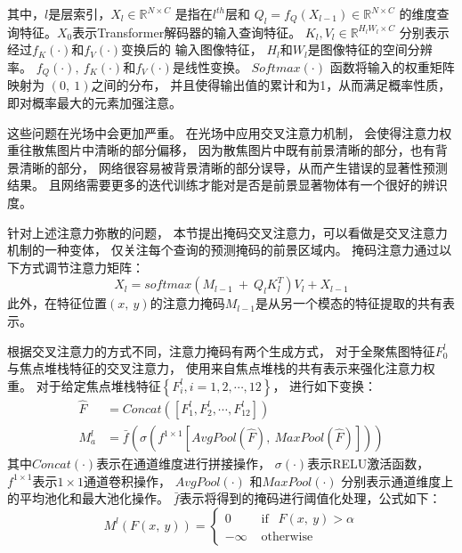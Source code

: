 其中，$l$是层索引，$X_{l} \in \mathbb{R}^{N\times C}$
是指在$l^{th}$层和
$ Q_{l} = f_{Q} \left ( X_{l-1} \right ) \in \mathbb{R}^{N \times C} $
的维度查询特征。$X_{0}$表示Transformer解码器的输入查询特征。
$K_{l},V_{l} \in \mathbb{R}^{H_{l}W_{l} \times C}$
分别表示经过$f_{K}(\cdot) $和$ f_{V}( \cdot )$变换后的
输入图像特征，
$H_{l}$和$W_{l}$是图像特征的空间分辨率。
$f_{Q} (\cdot),~f_{K}(\cdot) $和$ f_{V}(\cdot) $是线性变换。
$ Softmax(\cdot) $ 函数将输入的权重矩阵映射为 $(0,~1)$之间的分布，
并且使得输出值的累计和为1，从而满足概率性质，即对概率最大的元素加强注意。
%
%
%
%
%
\par
%
%
%
%
这些问题在光场中会更加严重。
在光场中应用交叉注意力机制，
会使得注意力权重往散焦图片中清晰的部分偏移，
因为散焦图片中既有前景清晰的部分，也有背景清晰的部分，
网络很容易被背景清晰的部分误导，从而产生错误的显著性预测结果。
且网络需要更多的迭代训练才能对是否是前景显著物体有一个很好的辨识度。
%
%
%
%
%
\par
%
%
%
%
针对上述注意力弥散的问题，
本节提出掩码交叉注意力，可以看做是交叉注意力机制的一种变体，
仅关注每个查询的预测掩码的前景区域内。
% 
% 
% 
% 
掩码注意力通过以下方式调节注意力矩阵：
\begin{equation}
	X_{l}=softmax(M_{l-1} ~+~Q_{l}K_{l}^{T})V_{l} + X_{l-1}
\end{equation}
% 
% 
此外，在特征位置$(x,~y)$的注意力掩码$M_{l-1}$是从另一个模态的特征提取的共有表示。
%
%
%
%
%
%
\par 
%
%
%
%
根据交叉注意力的方式不同，注意力掩码有两个生成方式，
对于全聚焦图特征$F_{0}^{l}$与焦点堆栈特征的交叉注意力，
使用来自焦点堆栈的共有表示来强化注意力权重。
对于给定焦点堆栈特征$\left \{ F_{i}^{l}, i=1,2,\cdots, 12 \right \}$，
进行如下变换：
%
%
%
%
\begin{equation}
\begin{aligned}
	\hat{F} &= Concat(\left [  F_{1}^{l}, F_{2}^{l}, \cdots, F_{12}^{l} \right ] ) \\
	M_{a}^{l} &= \bar{f}
	\left (  \sigma \left ( f^{1 \times 1}\left [  
	AvgPool\left ( \hat{F} \right ) ,~ MaxPool\left ( \hat{F} \right ) 
	\right ]  \right )  \right )
\end{aligned}
\end{equation}
%
%
%
其中$Concat(\cdot)$表示在通道维度进行拼接操作，
$\sigma(\cdot)$表示RELU激活函数，
$f^{1\times 1}$表示$1\times 1$通道卷积操作，
$AvgPool(\cdot)$
和$MaxPool(\cdot)$
分别表示通道维度上的平均池化和最大池化操作。
$\bar{f}$表示将得到的掩码进行阈值化处理，公式如下：
%
%
%
%
%
%
%
\begin{equation}
M^{l}\left ( F\left ( x, ~y \right )  \right ) =
\begin{cases}
	0  & \text{ if } ~~ F(x,~y)>  \alpha \\
	-\infty & \text{ otherwise } 
\end{cases}
\end{equation}
